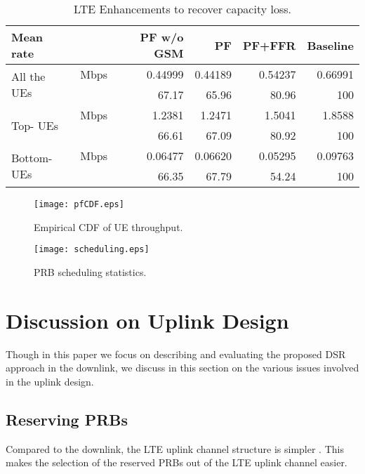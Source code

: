 \documentclass[10pt,journal]{IEEEtran}
\theoremstyle{slplain}
\begin{document}
\begin{table*}
\centering
\begin{tabular}{|l|l||r||r|r|r|}
\hline
Mean rate &    & PF w/o GSM  & PF & PF+FFR &  Baseline  \\ \hline
\multirow{2}{*}{All the UEs} & Mbps  & 0.44999  & 0.44189  & 0.54237   & 0.66991 \\ \cline{2-6}
                             &   & 67.17 & 65.96   & 80.96 & 100   \\
 \hline
  \multirow{2}{*}{Top- UEs} & Mbps  & 1.2381 & 1.2471 & 1.5041 & 1.8588  \\ \cline{2-6}
                                    &   & 66.61 & 67.09 & 80.92 & 100  \\
 \hline
 \multirow{2}{*}{Bottom- UEs} & Mbps  & 0.06477 & 0.06620 & 0.05295 & 0.09763  \\ \cline{2-6}
                                   &   & 66.35 & 67.79 & 54.24 & 100  \\
\hline
\end{tabular}
\caption{LTE Enhancements to recover capacity loss.}
\label{tab:rate}
\end{table*}


\begin{figure}
\centering
\texttt{[image: pfCDF.eps]}
\caption{Empirical CDF of UE throughput.}
\label{fig:pfCDF}
\end{figure}


\begin{figure}
\centering
\texttt{[image: scheduling.eps]}
\caption{PRB scheduling statistics.}
\label{fig:scheduling}
\end{figure}



\section{Discussion on Uplink Design}
\label{sec:uplink}


Though in this paper we focus on describing and evaluating the proposed DSR approach in the downlink, we discuss in this section on the various issues involved in the uplink design. 

\subsection{Reserving PRBs}

Compared to the downlink, the LTE uplink channel structure is simpler \cite{3gppMobility}. This makes the selection of the reserved PRBs out of the LTE uplink channel easier. 
\end{document}
